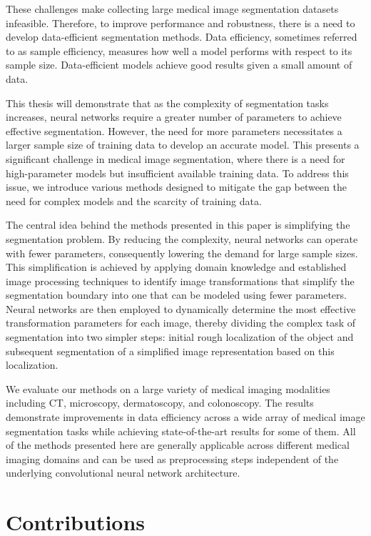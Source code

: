 These challenges make collecting large medical image segmentation datasets infeasible. Therefore, to improve performance and robustness, there is a need to develop data-efficient segmentation methods. Data efficiency, sometimes referred to as sample efficiency, measures how well a model performs with respect to its sample size. Data-efficient models achieve good results given a small amount of data.

This thesis will demonstrate that as the complexity of segmentation tasks increases, neural networks require a greater number of parameters to achieve effective segmentation. However, the need for more parameters necessitates a larger sample size of training data to develop an accurate model. This presents a significant challenge in medical image segmentation, where there is a need for high-parameter models but insufficient available training data. To address this issue, we introduce various methods designed to mitigate the gap between the need for complex models and the scarcity of training data.

The central idea behind the methods presented in this paper is simplifying the segmentation problem. By reducing the complexity, neural networks can operate with fewer parameters, consequently lowering the demand for large sample sizes. This simplification is achieved by applying domain knowledge and established image processing techniques to identify image transformations that simplify the segmentation boundary into one that can be modeled using fewer parameters. Neural networks are then employed to dynamically determine the most effective transformation parameters for each image, thereby dividing the complex task of segmentation into two simpler steps: initial rough localization of the object and subsequent segmentation of a simplified image representation based on this localization.

We evaluate our methods on a large variety of medical imaging modalities including CT, microscopy, dermatoscopy, and colonoscopy. The results demonstrate improvements in data efficiency across a wide array of medical image segmentation tasks while achieving state-of-the-art results for some of them. All of the methods presented here are generally applicable across different medical imaging domains and can be used as preprocessing steps independent of the underlying convolutional neural network architecture.

\section{Contributions}

